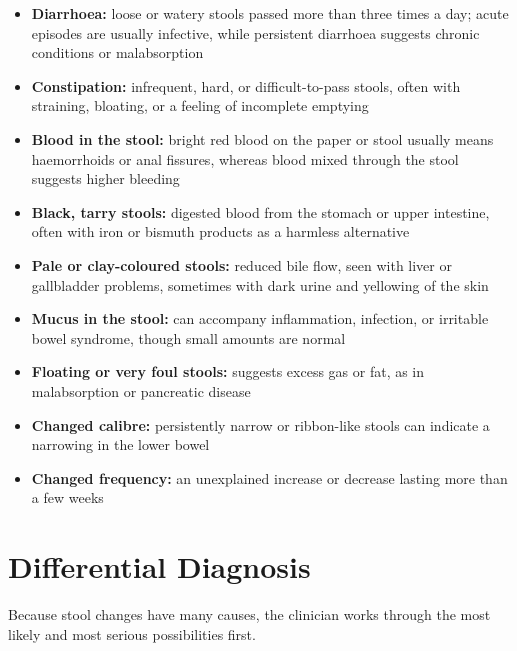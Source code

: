 \begin{itemize}
    \item \textbf{Diarrhoea:} loose or watery stools passed more than three times a day; acute episodes are usually infective, while persistent diarrhoea suggests chronic conditions or malabsorption
    \item \textbf{Constipation:} infrequent, hard, or difficult-to-pass stools, often with straining, bloating, or a feeling of incomplete emptying
    \item \textbf{Blood in the stool:} bright red blood on the paper or stool usually means haemorrhoids or anal fissures, whereas blood mixed through the stool suggests higher bleeding
    \item \textbf{Black, tarry stools:} digested blood from the stomach or upper intestine, often with iron or bismuth products as a harmless alternative
    \item \textbf{Pale or clay-coloured stools:} reduced bile flow, seen with liver or gallbladder problems, sometimes with dark urine and yellowing of the skin
    \item \textbf{Mucus in the stool:} can accompany inflammation, infection, or irritable bowel syndrome, though small amounts are normal
    \item \textbf{Floating or very foul stools:} suggests excess gas or fat, as in malabsorption or pancreatic disease
    \item \textbf{Changed calibre:} persistently narrow or ribbon-like stools can indicate a narrowing in the lower bowel
    \item \textbf{Changed frequency:} an unexplained increase or decrease lasting more than a few weeks
\end{itemize}

\section*{Differential Diagnosis}
Because stool changes have many causes, the clinician works through the most likely and most serious possibilities first.


